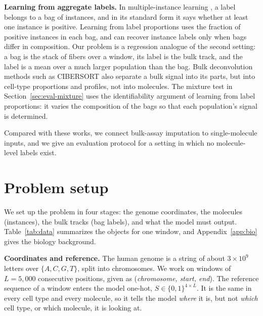 \documentclass[acmtog,nonacm]{acmart}   %
\begin{document}
\textbf{Learning from aggregate labels.} In multiple-instance learning \citep{Dietterich97, Ilse18}, a label
belongs to a bag of instances, and in its standard form it says whether at least one instance is positive.
Learning from label proportions \citep{Quadrianto09} uses the fraction of positive instances in each bag, and can
recover instance labels only when bags differ in composition. Our problem is a regression analogue of the second
setting: a bag is the stack of fibers over a window, its label is the bulk track, and the label is a mean over a
much larger population than the bag. Bulk deconvolution methods such as CIBERSORT \citep{Newman15} also separate a
bulk signal into its parts, but into cell-type proportions and profiles, not into molecules. The mixture test in
Section~\ref{sec:eval-mixture} uses the identifiability argument of learning from label proportions: it varies the
composition of the bags so that each population's signal is determined.

Compared with these works, we connect bulk-assay imputation to single-molecule inputs, and we give an evaluation
protocol for a setting in which no molecule-level labels exist.

\section{Problem setup}
\label{sec:problem}

We set up the problem in four stages: the genome coordinates, the molecules (instances), the bulk tracks (bag
labels), and what the model must output. Table~\ref{tab:data} summarizes the objects for one window, and
Appendix~\ref{app:bio} gives the biology background.

\textbf{Coordinates and reference.} The human genome is a string of about $3\times10^9$ letters over
$\{A,C,G,T\}$, split into chromosomes. We work on windows of $L=5{,}000$ consecutive positions, given as
(\emph{chromosome, start, end}). The reference sequence of a window enters the model one-hot,
$S\in\{0,1\}^{4\times L}$. It is the same in every cell type and every molecule, so it tells the model \emph{where}
it is, but not \emph{which} cell type, or which molecule, it is looking at.
\end{document}
